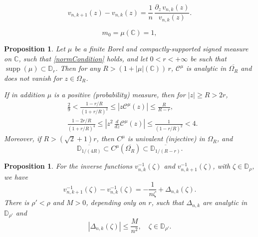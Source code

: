 \documentclass[10pt,a4paper]{amsart}
\theoremstyle{plain}
\newtheorem{prop}[thm]{Proposition}
\theoremstyle{remark}
\DeclareMathOperator{\supp}{supp}
\newcommand{\C}{\mathbb{C}}
\newcommand{\D}{\mathbb{D}}
\begin{document}
\begin{equation} \label{eqCauchyTransfNew}
	v_{n,k+1}(z)- v_{n,k}(z) =\frac{1}{n}\, \frac{\partial_z\, v_{n,k}(z)}{  v_{n,k}(z)}. 
\end{equation}

\begin{equation}
    \label{normCondition}
m_0=\mu(\C)=1,
\end{equation}

\begin{prop}
    \label{prob:boundsCauchy}
    Let $\mu$ be a finite Borel and compactly-supported signed measure on $\C$, such that \eqref{normCondition} holds, and let  $0<r<+\infty$ be such that $\supp (\mu) \subset\D_r$. Then for any $R>  (1+|\mu|(\C))\, r$,  $\mathcal C^\mu$ is analytic in $\overline{\Omega_R}$ and does not vanish for $z\in \Omega_R$.

If in addition $\mu$ is a positive (probability) measure, then for $|z|\ge R>2r$,
    \begin{align}
        \label{boundsCauchy1}
    & \frac{2}{9}< \frac{1-r/R}{(1+r/R)^2} \le \left|  z\mathcal C^\mu(z)\right| \le \frac{R}{R-r} ,
    \\  
    & \frac{1-2r/R}{(1+r/R)^4} \le \left| z^2\, \frac{d}{dz}\mathcal C^\mu(z)\right| \le \frac{1}{(1-r/R)^2}<4.
\label{boundsCauchy2}
    \end{align}
Moreover, if $R>(\sqrt{2}+1)r$, then $C^\mu$ is univalent (injective) in  $\Omega_R$, and 
\begin{equation} \label{image}
\overline{\D_{1/(4R)}}\subset C^\mu\left( \overline{\Omega_R} \right)\subset \overline{\D_{1/(R-r)}}.
\end{equation}
\end{prop}

\begin{prop}
    \label{lem5}
For the inverse functions $v_{n, k}^{-1}(\zeta)$ and $v_{n, k+1}^{-1}(\zeta)$, with $\zeta \in \D_\rho$, we have
\begin{equation}
    \label{eq:12}
v_{n,k+1}^{-1}\left(\zeta\right)-v_{n, k}^{-1}(\zeta)=-\frac{1}{n \zeta}  +\Delta_{n, k}(\zeta).
\end{equation}
There is $\rho'<\rho$ and $M>0$, depending only on $r$, such that $\Delta_{n, k}$ are analytic in $\D_{\rho'}$ and 
\begin{equation}
    \label{boundDelta}
    \left|\Delta_{n, k}(\zeta)\right| \leq \frac{M}{n^2 }, \quad \zeta \in \D_{\rho'}.
\end{equation}
\end{prop}
\end{document}
